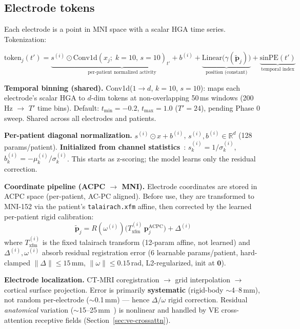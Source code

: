 \documentclass[11pt,letterpaper]{article}
\newcommand{\bfp}{\mathbf{p}}
\newcommand{\R}{\mathbb{R}}
\begin{document}
\subsection{Electrode tokens}\label{sec:tokens}

Each electrode is a point in MNI space with a scalar HGA time series. Tokenization:

\begin{equation}
\text{token}_j(t') = \underbrace{s^{(i)} \odot \text{Conv1d}(x_j;\; k{=}10,\, s{=}10)_{t'} + b^{(i)}}_{\text{per-patient normalized activity}} + \underbrace{\text{Linear}\bigl(\gamma(\tilde{\bfp}_j)\bigr)}_{\text{position (constant)}} + \underbrace{\text{sinPE}(t')}_{\text{temporal index}}
\end{equation}

\textbf{Temporal binning (shared).} Conv1d($1 \to d$, $k{=}10$, $s{=}10$): maps each electrode's scalar HGA to $d$-dim tokens at non-overlapping 50\,ms windows (200\,Hz $\to$ $T'$ time bins). Default: $t_{\min}{=}{-}0.2$, $t_{\max}{=}1.0$ ($T'{=}24$), pending Phase 0 sweep. Shared across all electrodes and patients.

\textbf{Per-patient diagonal normalization.} $s^{(i)} \odot x + b^{(i)}$, $s^{(i)}, b^{(i)} \in \R^d$ (128 params/patient). \textbf{Initialized from channel statistics}~\cite{karpowicz2025nomad}: $s^{(i)}_k = 1/\sigma_k^{(i)}$, $b^{(i)}_k = -\mu_k^{(i)}/\sigma_k^{(i)}$. This starts as z-scoring; the model learns only the residual correction.

\textbf{Coordinate pipeline (ACPC $\to$ MNI).} Electrode coordinates are stored in ACPC space (per-patient, AC-PC aligned). Before use, they are transformed to MNI-152 via the patient's \texttt{talairach.xfm} affine, then corrected by the learned per-patient rigid calibration:
\begin{equation}
\tilde{\bfp}_j = R(\omega^{(i)}) \bigl(T^{(i)}_{\text{xfm}}\, \bfp_j^{\text{ACPC}}\bigr) + \Delta^{(i)}
\end{equation}
where $T^{(i)}_{\text{xfm}}$ is the fixed talairach transform (12-param affine, not learned) and $\Delta^{(i)}, \omega^{(i)}$ absorb residual registration error (6 learnable params/patient, hard-clamped $\|\Delta\| \leq 15$\,mm, $\|\omega\| \leq 0.15$\,rad, L2-regularized, init at $\mathbf{0}$).

\textbf{Electrode localization.} CT-MRI coregistration $\to$ grid interpolation $\to$ cortical surface projection. Error is primarily \textbf{systematic} (rigid-body ${\sim}$4--8\,mm), not random per-electrode (${\sim}$0.1\,mm) --- hence $\Delta/\omega$ rigid correction. Residual \textit{anatomical} variation (${\sim}$15--25\,mm~\cite{eichert2020}) is nonlinear and handled by VE cross-attention receptive fields (Section~\ref{sec:ve-crossattn}).
\end{document}
